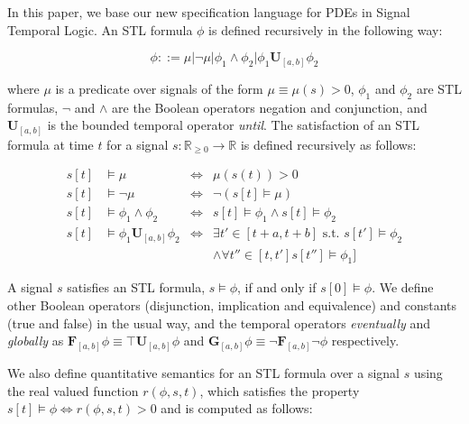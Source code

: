 \documentclass[oribibl]{llncs/llncs}
\newcommand*{\R}{\mathbb{R}}
\newcommand{\Always}{\mathbf{G}}
\newcommand{\Event}{\mathbf{F}}
\newcommand{\luntil}{\mathbf{U}}
\begin{document}

In this paper, we base our new specification language for PDEs in Signal
Temporal Logic. An STL formula $\phi$ is defined recursively in the following way:

\begin{equation}
    \phi ::= \mu | \lnot \mu | \phi_1 \land \phi_2 | \phi_1 \luntil_{[a,b]} \phi_2
\end{equation}

where $\mu$ is a predicate over signals of the form $\mu \equiv \mu(s) > 0$,
$\phi_1$ and $\phi_2$ are STL formulas,
$\lnot$ and $\land$ are the Boolean operators negation and conjunction, and
$\luntil_{[a, b]}$ is the bounded temporal operator \emph{until}. The satisfaction
of an STL formula at time $t$ for a signal $s :
\R_{\geq 0} \to \R$ is defined recursively as follows:

\begin{equation}
    \begin{aligned}
        s[t] &\models \mu &\iff &\mu(s(t)) > 0 \\
        s[t] &\models \lnot \mu &\iff &\lnot (s[t] \models \mu) \\
        s[t] &\models \phi_1 \land \phi_2 &\iff &s[t] \models \phi_1 \land s[t]
        \models \phi_2 \\
        s[t] &\models \phi_1 \luntil_{[a,b]} \phi_2 &\iff 
            &\exists t' \in [t+a, t+b] \text{ s.t. } s[t'] \models \phi_2 \\
        & & &\land \forall t'' \in [t, t'] s[t''] \models \phi_1]
    \end{aligned}
\end{equation}

A signal $s$ satisfies an STL formula, $s \models \phi$, if and
only if $s[0] \models \phi$. We define other Boolean operators (disjunction,
implication and equivalence) and constants (true and false) in the usual way, 
and the temporal operators
\emph{eventually} and \emph{globally} as $\Event_{[a, b]} \phi \equiv \top
\luntil_{[a,b]} \phi$ and $\Always_{[a, b]} \phi \equiv \lnot \Event_{[a,b]}
\lnot \phi$ respectively.

We also define quantitative semantics for an STL formula over a signal $s$
using the real valued function $r(\phi, s, t)$, which satisfies the property $s[t]
\models \phi \iff r(\phi,s, t) > 0$ and is computed as follows:
\end{document}
